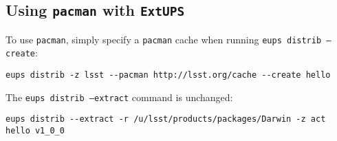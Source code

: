 \documentclass{article}
\newcommand{\code}[1]{\texttt{#1}}
\newcommand{\eups}{\code{ExtUPS}}
\newcommand{\pacman}{\code{pacman}}
\begin{document}
\subsection{Using \pacman{} with \eups{}}

To use \pacman{}, simply specify a \pacman{} cache when running \code{eups distrib --create}:
\begin{verbatim}
eups distrib -z lsst --pacman http://lsst.org/cache --create hello
\end{verbatim}

The \code{eups distrib --extract} command is unchanged:
\begin{verbatim}
eups distrib --extract -r /u/lsst/products/packages/Darwin -z act hello v1_0_0
\end{verbatim}
  
\end{document}
